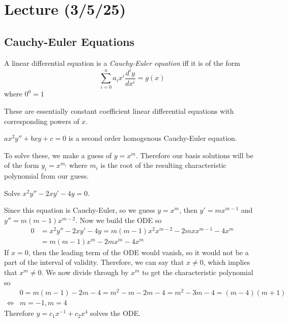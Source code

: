 \documentclass[notes]{subfiles}
\begin{document}
\setcounter{section}{13}
\section{Lecture (3/5/25)}

\subsection{Cauchy-Euler Equations}
\begin{definition}
    A linear differential equation is a \textit{Cauchy-Euler equation} iff it is of the form
    \[
        \sum_{i = 0}^n a_i x^i \frac{d^i y}{dx^i} = g(x)
    \]
    where $0^0 = 1$
\end{definition}
These are essentially constant coefficient linear differential equations with corresponding powers of $x$.

\begin{example}
    $ax^2 y'' + bxy + c = 0$ is a second order homogenous Cauchy-Euler equation.
\end{example}

To solve these, we make a guess of $y = x^m$. Therefore our basis solutions will be of the form $y_i = x^{m_i}$ where $m_i$ is the root of the resulting characteristic polynomial from our guess.

\begin{exercise}
    Solve $x^2y'' - 2xy' - 4y = 0$.
\end{exercise}
\begin{solution}
    Since this equation is Cauchy-Euler, so we guess $y = x^m$, then $y' = mx^{m - 1}$ and $y'' = m(m - 1)x^{m - 2}$.
    Now we build the ODE so
    \begin{align*}
        0
        &= x^2y'' - 2xy' - 4y
        = m(m - 1)x^2x^{m - 2} - 2mxx^{m - 1} - 4x^m \\
        &= m(m - 1)x^m - 2mx^m - 4x^m
    \end{align*}
    If $x = 0$, then the leading term of the ODE would vanish, so it would not be a part of the interval of validity. Therefore, we can say that $x \neq 0$, which implies that $x^m \neq 0$. We now divide through by $x^m$ to get the characteristic polynomial so
    \begin{align*}
        &0 = m(m - 1) - 2m - 4 = m^2 - m - 2m - 4 = m^2 - 3m - 4 = (m - 4)(m + 1) \\
        \iff& m = -1, m = 4
    \end{align*}
    Therefore $y = c_1x^{-1} + c_2x^4$ solves the ODE.
\end{solution}
\end{document}
